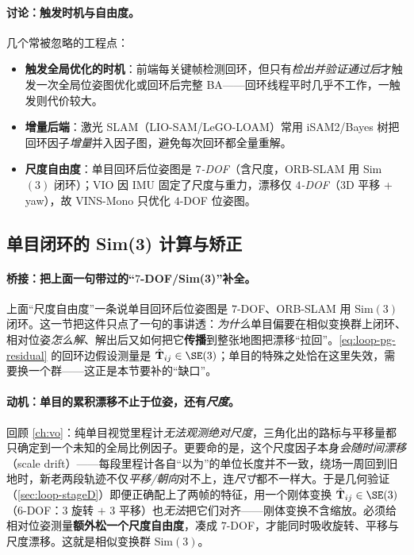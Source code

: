 \paragraph{讨论：触发时机与自由度。}
几个常被忽略的工程点\cite{gaoxiang2019slam14,murartal2015orbslam,qin2018vins}：
\begin{itemize}
  \item \textbf{触发全局优化的时机}：前端每关键帧检测回环，但只有\emph{检出并验证通过后}才触发一次全局位姿图优化或回环后完整 BA——回环线程平时几乎不工作，一触发则代价较大。
  \item \textbf{增量后端}：激光 SLAM（LIO-SAM/LeGO-LOAM）常用 iSAM2/Bayes 树把回环因子\emph{增量}并入因子图\cite{kaess2012isam2}，避免每次回环都全量重解。
  \item \textbf{尺度自由度}：单目回环后位姿图是 \emph{$7$-DOF}（含尺度，ORB-SLAM 用 Sim$(3)$ 闭环\cite{murartal2015orbslam}）；VIO 因 IMU 固定了尺度与重力，漂移仅 \emph{$4$-DOF}（$3$D 平移 + yaw），故 VINS-Mono 只优化 $4$-DOF 位姿图\cite{qin2018vins}。
\end{itemize}

\subsection{单目闭环的 Sim(3) 计算与矫正}
\label{sec:loop-sim3}

\paragraph{桥接：把上面一句带过的“$7$-DOF/Sim(3)”补全。}
上面“尺度自由度”一条说单目回环后位姿图是 $7$-DOF、ORB-SLAM 用 Sim$(3)$ 闭环\cite{murartal2015orbslam}。这一节把这件只点了一句的事讲透：\emph{为什么}单目偏要在相似变换群上闭环、相对位姿\emph{怎么解}、解出后又如何把它\textbf{传播}到整张地图把漂移“拉回”。\cref{eq:loop-pg-residual} 的回环边假设测量是 $\hat{\mathbf T}_{ij}\in\SE(3)$；单目的特殊之处恰在这里失效，需要换一个群——这正是本节要补的“缺口”。

\paragraph{动机：单目的累积漂移不止于位姿，还有\emph{尺度}。}
回顾 \cref{ch:vo}：纯单目视觉里程计\emph{无法观测绝对尺度}，三角化出的路标与平移量都只确定到一个未知的全局比例因子。更要命的是，这个尺度因子本身\emph{会随时间漂移}（scale drift）——每段里程计各自“以为”的单位长度并不一致，绕场一周回到旧地时，新老两段轨迹不仅\emph{平移/朝向}对不上，连\emph{尺寸}都不一样大。于是几何验证（\cref{sec:loop-stageD}）即便正确配上了两帧的特征，用一个刚体变换 $\hat{\mathbf T}_{ij}\in\SE(3)$（$6$-DOF：$3$ 旋转 $+$ $3$ 平移）也\emph{无法}把它们对齐——刚体变换不含缩放。必须给相对位姿测量\textbf{额外松一个尺度自由度}，凑成 $7$-DOF，才能同时吸收旋转、平移与尺度漂移\cite{murartal2015orbslam}。这就是相似变换群 Sim$(3)$。

